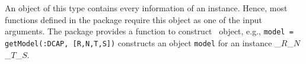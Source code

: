 An object of this type contains every information of an instance. Hence, most functions defined in the package require this object as one of the input arguments. The package provides a function to construct \jumpmodel\ object, e.g., \texttt{model = getModel(:DCAP, [R,N,T,S])} constructs an object \texttt{model} for an instance \dcap\_$R$\_$N$\_$T$\_$S$.
%
%
